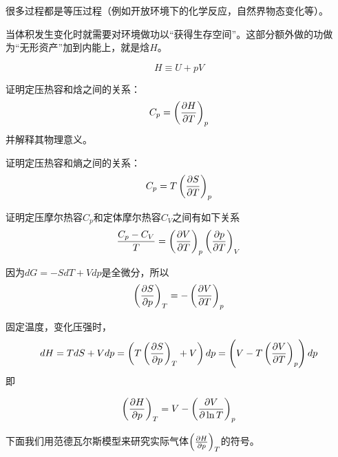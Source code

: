 \documentclass[CJK]{beamer}
\begin{document}
\begin{frame}
\bch


很多过程都是等压过程（例如开放环境下的化学反应，自然界物态变化等）。

\hspace{0.1in}

当体积发生变化时就需要对环境做功以“获得生存空间”。这部分额外做的功做为“无形资产”加到内能上，就是焓$H$。

$$ H  \equiv U + pV$$ 

\ech
\end{frame}



\begin{frame}
\bch
{}

证明定压热容和焓之间的关系：
{\blue
$$ C_p = \left(\frac{\partial H}{\partial T}\right)_{p} $$}
并解释其物理意义。
\ech
\end{frame}

\begin{frame}
\bch
{}

证明定压热容和熵之间的关系：
{\blue
$$ C_p = T\left(\frac{\partial S}{\partial T}\right)_{p} $$
}
\ech
\end{frame}


\begin{frame}
\bch


证明定压摩尔热容$C_p$和定体摩尔热容$C_V$之间有如下关系
{\blue
$$\frac{C_p-C_V}{T} =  \left(\frac{\partial V}{\partial T}\right)_{p} \left(\frac{\partial p}{\partial T}\right)_{V}$$
}

\ech
\end{frame}




\begin{frame}
\bch
因为$d G = - SdT + Vdp$是全微分，所以
{\blue
$$ \left(\frac{\partial S}{\partial p}\right)_{T} = - \left(\frac{\partial V}{\partial T}\right)_{p}$$
}

固定温度，变化压强时，
$$ dH = TdS + Vdp = \left( T\left(\frac{\partial S}{\partial p}\right)_{T} + V\right) dp = \left( V - T\left(\frac{\partial V}{\partial T}\right)_{p}\right) dp$$
即

{\blue
$$\left(\frac{\partial H}{\partial p}\right)_{T} = V - \left(\frac{\partial V}{\partial \ln T}\right)_{p}$$  
}

下面我们用范德瓦尔斯模型来研究实际气体$\left(\frac{\partial H}{\partial p}\right)_{T}$的符号。

\ech
\end{frame}
\end{document}
